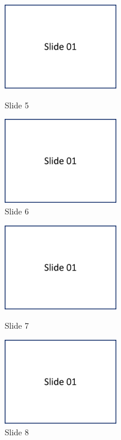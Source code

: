 \begin{figure}[H]
\parbox{74.mm}{
    \centering
    \includegraphics[width=0.45\textwidth,page=5]{appendix/images/PresentationSlides}
    \caption*{Slide 5}
}
    \parbox{74.mm}{
    \centering
    \includegraphics[width=0.45\textwidth,page=6]{appendix/images/PresentationSlides}
    \caption*{Slide 6}
}
\end{figure}

\begin{figure}[H]
\parbox{74.mm}{
    \centering
    \includegraphics[width=0.45\textwidth,page=7]{appendix/images/PresentationSlides}
    \caption*{Slide 7}
}
    \parbox{74.mm}{
    \centering
    \includegraphics[width=0.45\textwidth,page=8]{appendix/images/PresentationSlides}
    \caption*{Slide 8}
}
\end{figure}

